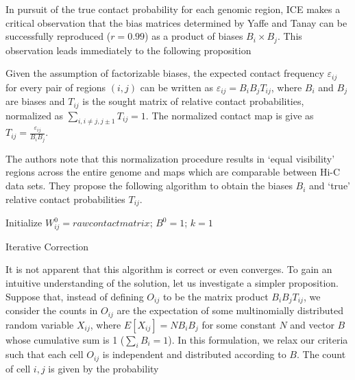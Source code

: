 In pursuit of the true contact probability for each genomic region, \gls{ICE} makes a critical observation that the bias matrices determined by
Yaffe and Tanay \citep{yaffe2011} can be successfully reproduced ($r = 0.99$) as a product of biases $B_i \times B_j$.  This observation leads
immediately to the following proposition

\begin{prop}
  Given the assumption of factorizable biases, the expected contact frequency $\varepsilon_{ij}$ for every pair of regions $(i,j)$ can
  be written as $\varepsilon_{ij} = B_{i}B_{j}T_{ij}$, where $B_i$ and $B_j$ are biases and $T_{ij}$ is the sought matrix of relative contact
  probabilities, normalized as $\sum_{i, i \neq j, j \pm 1}T_{ij} = 1$.  The normalized contact map is give as
  $T_{ij} = \frac{\varepsilon_{ij}}{B_{i}B_{j}}$.
\end{prop}

The authors note that this normalization procedure results in `equal visibility' regions across the entire genome and maps which are
comparable between Hi-C data sets.  They propose the following algorithm to obtain the biases $B_i$ and `true' relative contact probabilities
$T_{ij}$.

\begin{algorithm}[H]
  Initialize $W^{0}_{ij} = raw contact matrix$; $B^0 = 1$; $k = 1$\;
  \caption{Iterative Correction}
\end{algorithm}

It is not apparent that this algorithm is correct or even converges.  To gain an intuitive understanding of the solution, let us investigate a
simpler proposition.  Suppose that, instead of defining $O_{ij}$ to be the matrix product $B_{i}B_{j}T_{ij}$, we consider the counts
in $O_{ij}$ are the expectation of some multinomially distributed random variable $X_{ij}$, where $E[X_{ij}] = NB_{i}B_j$ for some
constant $N$ and vector $B$ whose cumulative sum is 1 ($\sum_{i}B_i = 1$).  In this formulation, we relax our criteria such that each cell
$O_{ij}$ is independent and distributed according to $B$.  The count of cell $i,j$ is given by the probability

